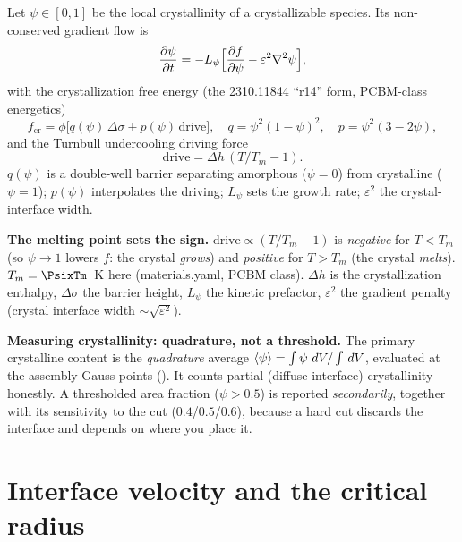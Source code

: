 Let $\psi\in[0,1]$ be the local crystallinity of a crystallizable species.
Its non-conserved gradient flow is
%
\begin{equation}
  \frac{\partial \psi}{\partial t} = -L_\psi\Big[\frac{\partial f}{\partial \psi} - \varepsilon^2\nabla^2\psi\Big],
\end{equation}
%
with the crystallization free energy (the 2310.11844 ``r14'' form,
PCBM-class energetics)
%
\begin{equation}
  f_{\text{cr}} = \phi\big[q(\psi)\,\Delta\sigma + p(\psi)\,\text{drive}\big],
  \quad q=\psi^2(1-\psi)^2,\quad p=\psi^2(3-2\psi),
\end{equation}
%
and the Turnbull undercooling driving force
%
\begin{equation}
  \text{drive} = \Delta h\,(T/T_m - 1).
\end{equation}
%
$q(\psi)$ is a double-well barrier separating amorphous ($\psi=0$) from
crystalline ($\psi=1$); $p(\psi)$ interpolates the driving; $L_\psi$ sets
the growth rate; $\varepsilon^2$ the crystal-interface width.

\begin{keybox}
\textbf{The melting point sets the sign.} $\text{drive}\propto(T/T_m-1)$
is \emph{negative} for $T<T_m$ (so $\psi\to1$ lowers $f$: the crystal
\emph{grows}) and \emph{positive} for $T>T_m$ (the crystal \emph{melts}).
$T_m=\ensuremath{\PsixTm}$~K here (materials.yaml, PCBM class). $\Delta h$
is the crystallization enthalpy, $\Delta\sigma$ the barrier height,
$L_\psi$ the kinetic prefactor, $\varepsilon^2$ the gradient penalty
(crystal interface width $\sim\sqrt{\varepsilon^2}$).
\end{keybox}

\begin{keybox}
\textbf{Measuring crystallinity: quadrature, not a threshold.} The primary
crystalline content is the \emph{quadrature} average
$\langle\psi\rangle = \int\psi\,\,dV / \int\,dV$, evaluated at the assembly
Gauss points (). It counts partial
(diffuse-interface) crystallinity honestly. A thresholded area fraction
($\psi>0.5$) is reported \emph{secondarily}, together with its sensitivity
to the cut ($0.4$/$0.5$/$0.6$), because a hard cut discards the interface
and depends on where you place it.
\end{keybox}

\section{Interface velocity and the critical radius}

